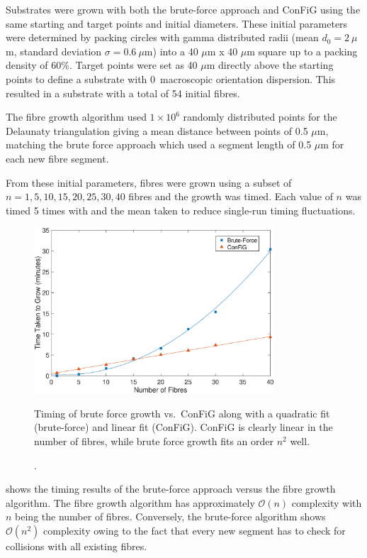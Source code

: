 Substrates were grown with both the brute-force approach and ConFiG using the same starting and target points and initial diameters.
These initial parameters were determined by packing circles with gamma distributed radii (mean $d_0 = 2\ \mu$m, standard deviation $\sigma = 0.6\ \mu$m) into a 40 $\mu$m x 40 $\mu$m square up to a packing density of 60\%. Target points were set as 40 $\mu$m directly above the starting points to define a substrate with 0\degree\ macroscopic orientation dispersion.
This resulted in a substrate with a total of 54 initial fibres. 

The fibre growth algorithm used $1\times 10^6$ randomly distributed points for the Delaunaty triangulation giving a mean distance between points of 0.5 $\mu$m, matching the brute force approach which used a segment length of 0.5 $\mu$m for each new fibre segment. 

From these initial parameters, fibres were grown using a subset of $n = 1, 5, 10, 15, 20, 25, 30, 40$ fibres and the growth was timed. Each value of $n$ was timed 5 times with and the mean taken to reduce single-run timing fluctuations.

\begin{figure}[h!]
  \centering
  \includegraphics[width=0.8\textwidth]{figures/config/brute_force_vs_algo_2.eps}
  \caption[Timing of brute force growth vs. \ac{ConFiG}].{\small Timing of brute force growth vs.\ ConFiG along with a quadratic fit (brute-force) and linear fit (\ac{ConFiG}). \ac{ConFiG} is clearly linear in the number of fibres, while brute force growth fits an order $n^2$ well. }
  \label{fig:brute_force_vs_algo}
\end{figure}

 shows the timing results of the brute-force approach versus the fibre growth algorithm.
The fibre growth algorithm  has approximately $\mathcal{O}(n)$ complexity with $n$ being the number of fibres.
Conversely, the brute-force algorithm shows $\mathcal{O}(n^2)$ complexity owing to the fact that every new segment has to check for collisions with all existing fibres.


